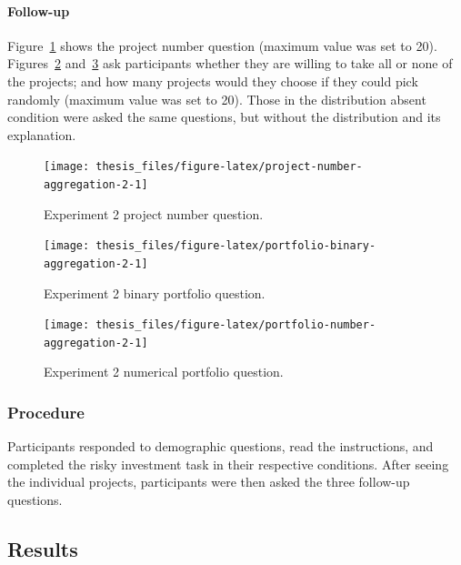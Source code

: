 \documentclass[a4paper, nobind, dvipsnames]{templates/ociamthesis}
\theoremstyle{definition}
\theoremstyle{definition}
\theoremstyle{definition}
\theoremstyle{definition}
\theoremstyle{remark}
\begin{document}
\hypertarget{follow-up-materials-aggregation-2-appendix}{%
\paragraph{Follow-up}\label{follow-up-materials-aggregation-2-appendix}}

Figure~\ref{fig:project-number-aggregation-2} shows the project number
question (maximum value was set to 20).
Figures~\ref{fig:portfolio-binary-aggregation-2}
and~\ref{fig:portfolio-number-aggregation-2} ask participants whether they are
willing to take all or none of the projects; and how many projects would they
choose if they could pick randomly (maximum value was set to 20). Those in the
distribution absent condition were asked the same questions, but without the
distribution and its explanation.



\begin{figure}
\texttt{[image: thesis\_files/figure-latex/project-number-aggregation-2-1]} \caption{Experiment 2 project number question.}\label{fig:project-number-aggregation-2}
\end{figure}



\begin{figure}
\texttt{[image: thesis\_files/figure-latex/portfolio-binary-aggregation-2-1]} \caption{Experiment 2 binary portfolio question.}\label{fig:portfolio-binary-aggregation-2}
\end{figure}



\begin{figure}
\texttt{[image: thesis\_files/figure-latex/portfolio-number-aggregation-2-1]} \caption{Experiment 2 numerical portfolio question.}\label{fig:portfolio-number-aggregation-2}
\end{figure}

\hypertarget{procedure-5}{%
\subsubsection{Procedure}\label{procedure-5}}

Participants responded to demographic questions, read the instructions, and
completed the risky investment task in their respective conditions. After seeing
the individual projects, participants were then asked the three follow-up
questions.

\hypertarget{results-aggregation-2-appendix}{%
\subsection{Results}\label{results-aggregation-2-appendix}}
\end{document}
